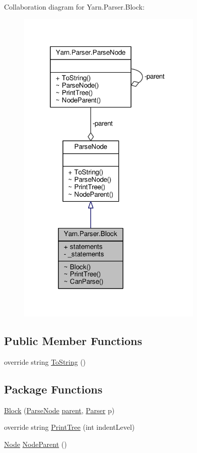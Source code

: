 Collaboration diagram for Yarn.\-Parser.\-Block\-:
\nopagebreak
\begin{figure}[H]
\begin{center}
\leavevmode
\includegraphics[width=251pt]{dc/d6a/a00261}
\end{center}
\end{figure}
\subsection*{Public Member Functions}
\begin{DoxyCompactItemize}
\item 
override string \hyperlink{a00063_a18c67cb16090d0889bb9d6c8c6c565f8}{To\-String} ()
\end{DoxyCompactItemize}
\subsection*{Package Functions}
\begin{DoxyCompactItemize}
\item 
\hyperlink{a00022_a943abeb93be783da7ff6ca595b6a34e7}{Block} (\hyperlink{a00063}{Parse\-Node} \hyperlink{a00063_af313a82103fcc2ff5a177dbb06b92f7b}{parent}, \hyperlink{a00064}{Parser} p)
\item 
override string \hyperlink{a00022_aaaacfc4e3ff2871fa5e2fb75e48636de}{Print\-Tree} (int indent\-Level)
\item 
\hyperlink{a00054}{Node} \hyperlink{a00063_a580e520a29444fc23ac3660cbe514a09}{Node\-Parent} ()
\end{DoxyCompactItemize}
